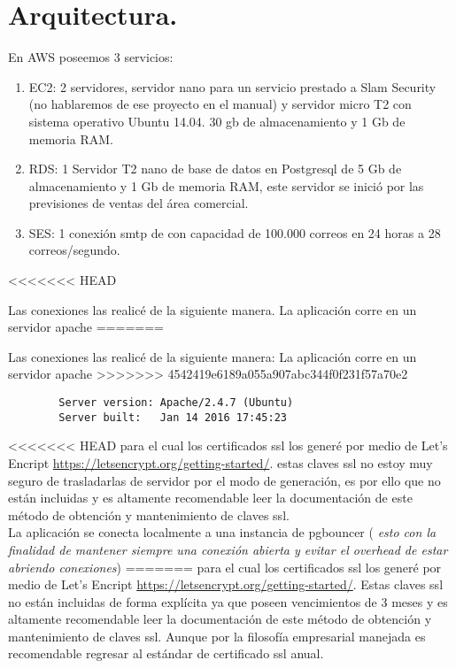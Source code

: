 \documentclass[10pt,a4paper]{book}
\begin{document}
	\section{Arquitectura.}
	En AWS poseemos 3 servicios:
	\begin{enumerate}
		\item EC2: 2 servidores, servidor nano para un servicio prestado a Slam Security (no hablaremos de ese proyecto en el manual) y servidor micro T2 con sistema operativo Ubuntu 14.04. 30 gb de almacenamiento y 1 Gb de memoria RAM.
		\item RDS: 1 Servidor T2 nano de base de datos en Postgresql de 5 Gb de almacenamiento y 1 Gb de memoria RAM, este servidor se inició por las previsiones de ventas del área comercial.
		\item SES: 1 conexión smtp de con capacidad de 100.000 correos en 24 horas a 28 correos/segundo.
	\end{enumerate}
<<<<<<< HEAD

	Las conexiones las realicé de la siguiente manera. La aplicación corre en un servidor apache
=======
	
	Las conexiones las realicé de la siguiente manera: La aplicación corre en un servidor apache
>>>>>>> 4542419e6189a055a907abc344f0f231f57a70e2
	\begin{verbatim}
		Server version: Apache/2.4.7 (Ubuntu)
		Server built:   Jan 14 2016 17:45:23
	\end{verbatim}
<<<<<<< HEAD
	para el cual los certificados ssl los generé por medio de Let's Encript \url{https://letsencrypt.org/getting-started/}. estas claves ssl no estoy muy seguro de trasladarlas de servidor por el modo de generación, es por ello que no están incluidas y es altamente recomendable leer la documentación de este método de obtención  y mantenimiento de claves ssl.\\

	La aplicación se conecta localmente a una instancia de pgbouncer ( \textit{esto con la finalidad de mantener siempre una conexión abierta y evitar el overhead de estar abriendo conexiones})
=======
	para el cual los certificados ssl los generé por medio de Let's Encript \url{https://letsencrypt.org/getting-started/}. Estas claves ssl no están incluidas de forma explícita ya que poseen vencimientos de 3 meses y es altamente recomendable leer la documentación de este método de obtención y mantenimiento de claves ssl. Aunque por la filosofía empresarial manejada es recomendable regresar al estándar de certificado ssl anual.\\
	
\end{document}
